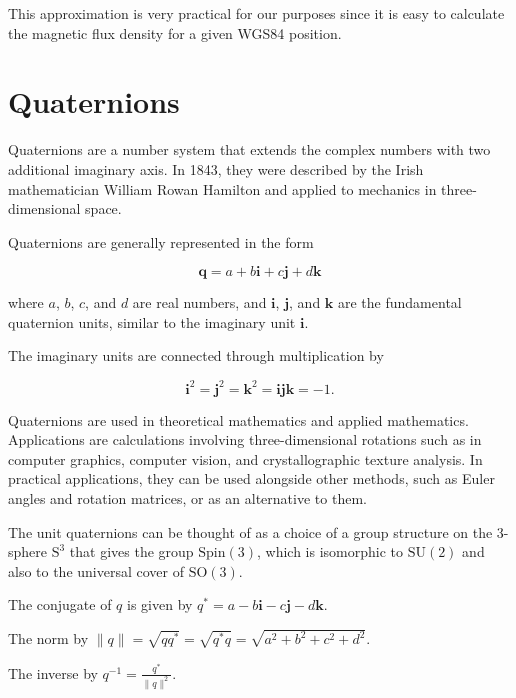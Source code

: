 This approximation is very practical for our purposes since it is easy to calculate the magnetic flux density for a given WGS84 position.

\section{Quaternions}

Quaternions are a number system that extends the complex numbers with two additional imaginary axis. In 1843, they were described by the Irish mathematician William Rowan Hamilton and applied to mechanics in three-dimensional space.

Quaternions are generally represented in the form

\begin{equation}
\label{eq:quaternion}
    \bm{q} = a + b \bm{i} + c \bm{j} + d \bm{k}
\end{equation}

where $a$, $b$, $c$, and $d$ are real numbers, and $\bm{i}$, $\bm{j}$, and $\bm{k}$ are the fundamental quaternion units, similar to the imaginary unit $\bm{i}$.

The imaginary units are connected through multiplication by

\begin{equation}
\label{eq:quaternion_units}
    \bm{i}^2 = \bm{j}^2 = \bm{k}^2 = \bm{ijk} = -1 \textrm{.}
\end{equation}

Quaternions are used in theoretical mathematics and applied mathematics. Applications are calculations involving three-dimensional rotations such as in computer graphics, computer vision, and crystallographic texture analysis. In practical applications, they can be used alongside other methods, such as Euler angles and rotation matrices, or as an alternative to them.

The unit quaternions can be thought of as a choice of a group structure on the 3-sphere $\text{S}^3$ that gives the group $\text{Spin}(3)$, which is isomorphic to $\text{SU}(2)$ and also to the universal cover of $\text{SO}(3)$.

The conjugate of $q$ is given by $q^* = a - b \bm{i} - c \bm{j} - d \bm{k}$.

The norm by $\lVert q\rVert = \sqrt{qq^*} = \sqrt{q^{*}q} = \sqrt{a^2 + b^2 + c^2 + d^2}$.

The inverse by $q^{-1} = \frac{q^*}{\lVert q\rVert ^2}$.

